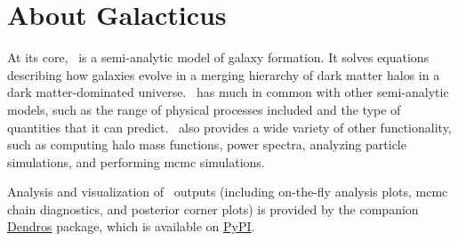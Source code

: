 \chapter{About Galacticus}

At its core, \glc\ is a semi-analytic model of galaxy formation. It solves equations describing how galaxies evolve in a merging hierarchy of dark matter halos in a dark matter-dominated universe. \glc\ has much in common with other semi-analytic models, such as the range of physical processes included and the type of quantities that it can predict. \glc\ also provides a wide variety of other functionality, such as computing halo mass functions, power spectra, analyzing particle simulations, and performing \gls{mcmc} simulations.

Analysis and visualization of \glc\ outputs (including on-the-fly analysis plots, \gls{mcmc} chain diagnostics, and posterior corner plots) is provided by the companion \href{https://github.com/galacticusorg/dendros}{Dendros} package, which is available on \href{https://pypi.org/project/dendros/}{PyPI}.

